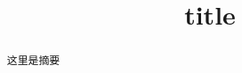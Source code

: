 \documentclass{myclass}
\title{title}
\begin{document}
\begin{abstract}
这里是摘要
\end{abstract}






\end{document}
